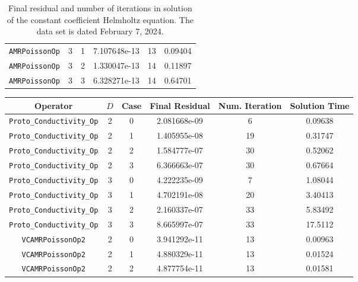 \documentclass{article}
\begin{document}
\begin{small}
\begin{table}
\begin{center}
\begin{tabular}{|c|c|c|c|c||c|}
 {\tt AMRPoissonOp}               & 3   & 1    & 7.107648e-13   &  13 & 0.09404\\
 {\tt AMRPoissonOp}               & 3   & 2    & 1.330047e-13   &  14 & 0.11897\\
 {\tt AMRPoissonOp}               & 3   & 3    & 6.328271e-13   &  14 & 0.64701\\
\hline
\end{tabular}
\end{center}
\label{tab::helmholtz2}
\caption
    {
      Final residual and number of iterations in solution of the  constant
      coefficient Helmholtz equation.
      The data set is dated February 7, 2024.
    }
\end{table}
\end{small}

\begin{small}
\begin{table}
\begin{center}
\begin{tabular}{|c|c|c|c|c||c|} \hline
 Operator                   & $D$ & Case & Final Residual &
 Num. Iteration & Solution Time\\
\hline
 {\tt Proto\_Conductivity\_Op}    & 2   & 0    & 2.081668e-09   & 6    & 0.09638\\
 {\tt Proto\_Conductivity\_Op}    & 2   & 1    & 1.405955e-08   & 19   & 0.31747\\
 {\tt Proto\_Conductivity\_Op}    & 2   & 2    & 1.584777e-07   & 30   & 0.52062\\
 {\tt Proto\_Conductivity\_Op}    & 2   & 3    & 6.366663e-07   & 30   & 0.67664\\
 {\tt Proto\_Conductivity\_Op}    & 3   & 0    & 4.222235e-09   & 7    & 1.08044\\
 {\tt Proto\_Conductivity\_Op}    & 3   & 1    & 4.702191e-08   & 20   & 3.40413\\
 {\tt Proto\_Conductivity\_Op}    & 3   & 2    & 2.160337e-07   & 33   & 5.83492\\
 {\tt Proto\_Conductivity\_Op}    & 3   & 3    & 8.665997e-07   & 33   & 17.5112\\
\hline                                                     
 {\tt VCAMRPoissonOp2}            & 2   & 0    & 3.941292e-11   & 13   & 0.00963\\
 {\tt VCAMRPoissonOp2}            & 2   & 1    & 4.880329e-11   & 13   & 0.01524\\
 {\tt VCAMRPoissonOp2}            & 2   & 2    & 4.877754e-11   & 13   & 0.01581\\

\end{tabular}
\end{center}
\end{table}
\end{small}
\end{document}
